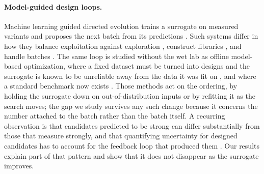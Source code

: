\documentclass{article}
\theoremstyle{plain}
\theoremstyle{definition}
\begin{document}
\paragraph{Model-guided design loops.}
Machine learning guided directed evolution trains a surrogate on measured variants and
proposes the next batch from its predictions \citep{yang2019machine, wu2019machine,
biswas2021low}. Such systems differ in how they balance exploitation against exploration
\citep{hie2022adaptive, brookes2019conditioning, stanton2022accelerating}, construct
libraries \citep{sinai2020adalead}, and handle batches
\citep{angermueller2020modelbased}. The same loop is studied without the wet lab as
offline model-based optimization, where a fixed dataset must be turned into designs and
the surrogate is known to be unreliable away from the data it was fit on
\citep{trabucco2021coms, fannjiang2020autofocused}, and where a standard benchmark now
exists \citep{trabucco2022designbench}. Those methods act on the ordering, by holding the surrogate
down on out-of-distribution inputs or by refitting it as the search moves; the gap we
study survives any such change because it concerns the number attached to the batch
rather than the batch itself. A recurring observation is that candidates
predicted to be strong can differ substantially from those that measure strongly, and
that quantifying uncertainty for designed candidates has to account for the feedback
loop that produced them \citep{hsu2022learning, fannjiang2022conformal}. Our results explain part of that
pattern and show that it does not disappear as the surrogate improves.
\end{document}
